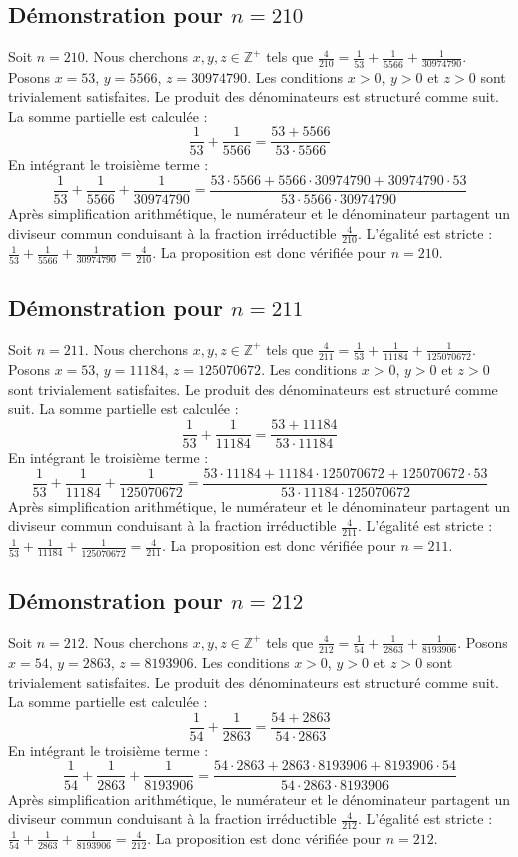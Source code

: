\documentclass[11pt,a4paper]{article}
\begin{document}
\subsection{Démonstration pour $n = 210$}
Soit $n = 210$. Nous cherchons $x, y, z \in \mathbb{Z}^{+}$ tels que $\frac{4}{210} = \frac{1}{53} + \frac{1}{5566} + \frac{1}{30974790}$.
Posons $x = 53$, $y = 5566$, $z = 30974790$.
Les conditions $x > 0$, $y > 0$ et $z > 0$ sont trivialement satisfaites.
Le produit des dénominateurs est structuré comme suit. La somme partielle est calculée :
$$ \frac{1}{53} + \frac{1}{5566} = \frac{53+5566}{53 \cdot 5566} $$
En intégrant le troisième terme :
$$ \frac{1}{53} + \frac{1}{5566} + \frac{1}{30974790} = \frac{53 \cdot 5566 + 5566 \cdot 30974790 + 30974790 \cdot 53}{53 \cdot 5566 \cdot 30974790} $$
Après simplification arithmétique, le numérateur et le dénominateur partagent un diviseur commun conduisant à la fraction irréductible $\frac{4}{210}$.
L'égalité est stricte : $\frac{1}{53} + \frac{1}{5566} + \frac{1}{30974790} = \frac{4}{210}$.
La proposition est donc vérifiée pour $n = 210$.
\subsection{Démonstration pour $n = 211$}
Soit $n = 211$. Nous cherchons $x, y, z \in \mathbb{Z}^{+}$ tels que $\frac{4}{211} = \frac{1}{53} + \frac{1}{11184} + \frac{1}{125070672}$.
Posons $x = 53$, $y = 11184$, $z = 125070672$.
Les conditions $x > 0$, $y > 0$ et $z > 0$ sont trivialement satisfaites.
Le produit des dénominateurs est structuré comme suit. La somme partielle est calculée :
$$ \frac{1}{53} + \frac{1}{11184} = \frac{53+11184}{53 \cdot 11184} $$
En intégrant le troisième terme :
$$ \frac{1}{53} + \frac{1}{11184} + \frac{1}{125070672} = \frac{53 \cdot 11184 + 11184 \cdot 125070672 + 125070672 \cdot 53}{53 \cdot 11184 \cdot 125070672} $$
Après simplification arithmétique, le numérateur et le dénominateur partagent un diviseur commun conduisant à la fraction irréductible $\frac{4}{211}$.
L'égalité est stricte : $\frac{1}{53} + \frac{1}{11184} + \frac{1}{125070672} = \frac{4}{211}$.
La proposition est donc vérifiée pour $n = 211$.
\subsection{Démonstration pour $n = 212$}
Soit $n = 212$. Nous cherchons $x, y, z \in \mathbb{Z}^{+}$ tels que $\frac{4}{212} = \frac{1}{54} + \frac{1}{2863} + \frac{1}{8193906}$.
Posons $x = 54$, $y = 2863$, $z = 8193906$.
Les conditions $x > 0$, $y > 0$ et $z > 0$ sont trivialement satisfaites.
Le produit des dénominateurs est structuré comme suit. La somme partielle est calculée :
$$ \frac{1}{54} + \frac{1}{2863} = \frac{54+2863}{54 \cdot 2863} $$
En intégrant le troisième terme :
$$ \frac{1}{54} + \frac{1}{2863} + \frac{1}{8193906} = \frac{54 \cdot 2863 + 2863 \cdot 8193906 + 8193906 \cdot 54}{54 \cdot 2863 \cdot 8193906} $$
Après simplification arithmétique, le numérateur et le dénominateur partagent un diviseur commun conduisant à la fraction irréductible $\frac{4}{212}$.
L'égalité est stricte : $\frac{1}{54} + \frac{1}{2863} + \frac{1}{8193906} = \frac{4}{212}$.
La proposition est donc vérifiée pour $n = 212$.
\end{document}

